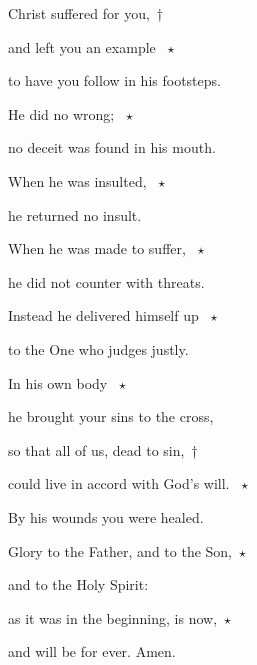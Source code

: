 \noindent Christ suffered for you,~†~\nopagebreak

and left you an example ~$\star$~\nopagebreak

to have you follow in his footsteps.

\noindent He did no wrong; ~$\star$~\nopagebreak

no deceit was found in his mouth.

\noindent When he was insulted, ~$\star$~\nopagebreak

he returned no insult.

\noindent When he was made to suffer, ~$\star$~\nopagebreak

he did not counter with threats.

\noindent Instead he delivered himself up ~$\star$~\nopagebreak

to the One who judges justly.

\noindent In his own body ~$\star$~\nopagebreak

he brought your sins to the cross,

\noindent so that all of us, dead to sin,~†~\nopagebreak

could live in accord with God’s will. ~$\star$~\nopagebreak

By his wounds you were healed.

\noindent Glory to the Father, and to the Son,~$\star$~\nopagebreak

and to the Holy Spirit:

\noindent as it was in the beginning, is now,~$\star$~\nopagebreak

and will be for ever. Amen.
